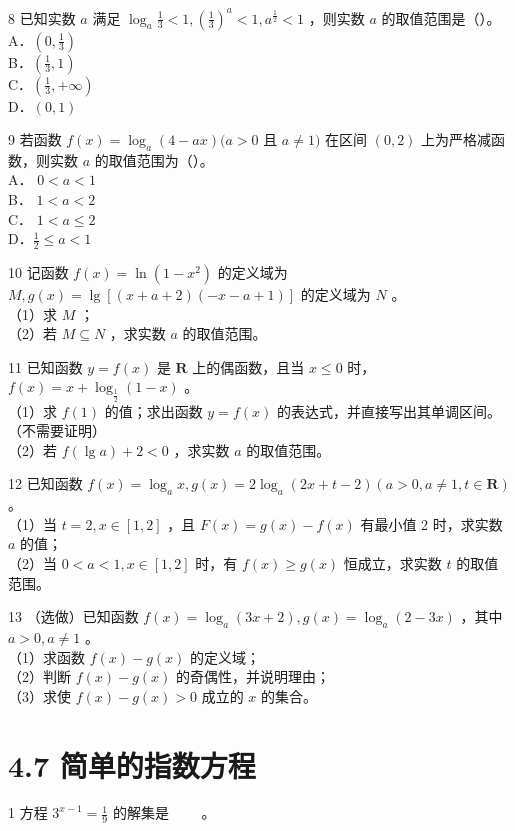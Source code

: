 \documentclass[10pt]{article}
\begin{document}
8 已知实数 \(a\) 满足 \(\log _{a} \frac{1}{3}<1,\left(\frac{1}{3}\right)^{a}<1, a^{\frac{1}{2}}<1\) ，则实数 \(a\) 的取值范围是（）。\\
A．\(\left(0, \frac{1}{3}\right)\)\\
B．\(\left(\frac{1}{3}, 1\right)\)\\
C．\(\left(\frac{1}{3},+\infty\right)\)\\
D．\((0,1)\)

9 若函数 \(f(x)=\log _{a}(4-a x)(a>0\) 且 \(a \neq 1)\) 在区间 \((0,2)\) 上为严格减函数，则实数 \(a\) 的取值范围为（）。\\
A． \(0<a<1\)\\
B． \(1<a<2\)\\
C． \(1<a \leqslant 2\)\\
D．\(\frac{1}{2} \leqslant a<1\)

10 记函数 \(f(x)=\ln \left(1-x^{2}\right)\) 的定义域为 \(M, g(x)=\lg [(x+a+2)(-x-a+1)]\) 的定义域为 \(N\) 。\\
（1）求 \(M\) ；\\
（2）若 \(M \subseteq N\) ，求实数 \(a\) 的取值范围。

11 已知函数 \(y=f(x)\) 是 \(\mathbf{R}\) 上的偶函数，且当 \(x \leqslant 0\) 时，\(f(x)=x+\log _{\frac{1}{2}}(1-x)\) 。\\
（1）求 \(f(1)\) 的值；求出函数 \(y=f(x)\) 的表达式，并直接写出其单调区间。（不需要证明）\\
（2）若 \(f(\lg a)+2<0\) ，求实数 \(a\) 的取值范围。

12 已知函数 \(f(x)=\log _{a} x, g(x)=2 \log _{a}(2 x+t-2)(a>0, a \neq 1, t \in \mathbf{R})\) 。\\
（1）当 \(t=2, x \in[1,2]\) ，且 \(F(x)=g(x)-f(x)\) 有最小值 2 时，求实数 \(a\) 的值；\\
（2）当 \(0<a<1, x \in[1,2]\) 时，有 \(f(x) \geqslant g(x)\) 恒成立，求实数 \(t\) 的取值范围。

13 （选做）已知函数 \(f(x)=\log _{a}(3 x+2), g(x)=\log _{a}(2-3 x)\) ，其中 \(a>0, a \neq 1\) 。\\
（1）求函数 \(f(x)-g(x)\) 的定义域；\\
（2）判断 \(f(x)-g(x)\) 的奇偶性，并说明理由；\\
（3）求使 \(f(x)-g(x)>0\) 成立的 \(x\) 的集合。

\section*{4.7 简单的指数方程}
1 方程 \(3^{x-1}=\frac{1}{9}\) 的解集是 \(\qquad\)。
\end{document}
